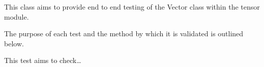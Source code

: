 \documentclass[letterpaper,10pt,english]{sphinxmanual}
\begin{document}

\begin{fulllineitems}
\label{\detokenize{index:tests.test_tensor.TestVector}}
\pysigstartsignatures
{}
\pysigstopsignatures
\sphinxAtStartPar
This class aims to provide end to end testing of the
Vector class within the tensor module.

\sphinxAtStartPar
The purpose of each test and the method by which it
is validated is outlined below.

\begin{fulllineitems}
\label{\detokenize{index:tests.test_tensor.TestVector.test_vector_construction}}
\pysigstartsignatures
{}
\pysigstopsignatures
\sphinxAtStartPar
This test aims to check…

\end{fulllineitems}


\end{fulllineitems}



\renewcommand{\indexname}{Python Module Index}
\begin{sphinxtheindex}
\let\bigletter\sphinxstyleindexlettergroup
\bigletter{e}
\item\relax{}
\indexspace
\bigletter{g}
\item\relax{}
\indexspace
\bigletter{t}
\item\relax{}
\end{sphinxtheindex}

\renewcommand{\indexname}{Index}
\printindex
\end{document}

